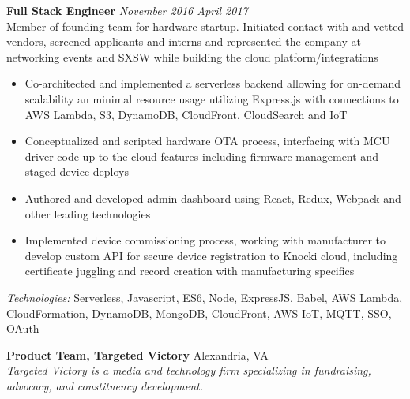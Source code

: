 \documentclass[10pt]{article}
\begin{document}
\begin{addmargin}[1em]{0em}
  \textbf{Full Stack Engineer} \hfill \textit{November 2016 \textendash{} April 2017} \\
  Member of founding team for hardware startup. Initiated contact with and vetted vendors, screened applicants and interns and represented the company at networking events and SXSW while building the cloud platform/integrations \\
  \vspace{-1.1em}
  \begin{itemize}
    \item Co-architected and implemented a serverless backend allowing for on-demand scalability an minimal resource usage utilizing Express.js with connections to AWS Lambda, S3, DynamoDB, CloudFront, CloudSearch and IoT
    \item Conceptualized and scripted hardware OTA process, interfacing with MCU driver code up to the cloud features including firmware management and staged device deploys
    \item Authored and developed admin dashboard using React, Redux, Webpack and other leading technologies
    \item Implemented device commissioning process, working with manufacturer to develop custom API for secure device registration to Knocki cloud, including certificate juggling and record creation with manufacturing specifics
  \end{itemize}
  \textit{Technologies:} Serverless, Javascript, ES6, Node, ExpressJS, Babel, AWS Lambda, CloudFormation, DynamoDB, MongoDB, CloudFront, AWS IoT, MQTT, SSO, OAuth
\end{addmargin}
\textbf{Product Team, Targeted Victory} \hfill Alexandria, VA \\
\textit{Targeted Victory is a media and technology firm specializing in fundraising, advocacy, and constituency development.} \\
\end{document}
